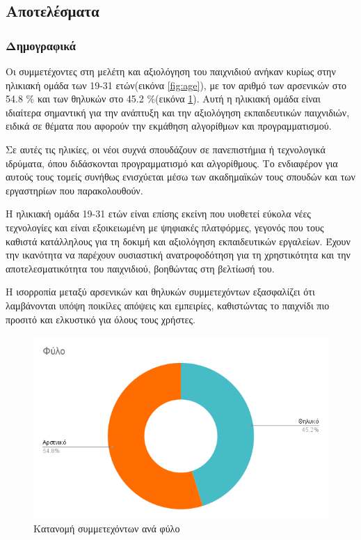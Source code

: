 \subsection{Αποτελέσματα}

\subsubsection{Δημογραφικά}

Οι συμμετέχοντες στη μελέτη και αξιολόγηση του παιχνιδιού ανήκαν κυρίως στην ηλικιακή ομάδα των 19-31 ετών(εικόνα \ref{fig:age}), με τον αριθμό των αρσενικών στο 54.8 \% και των θηλυκών στο 45.2 \%(εικόνα \ref{fig:gender}). Αυτή η ηλικιακή ομάδα είναι ιδιαίτερα σημαντική για την ανάπτυξη και την αξιολόγηση εκπαιδευτικών παιχνιδιών, ειδικά σε θέματα που αφορούν την εκμάθηση αλγορίθμων και προγραμματισμού.

Σε αυτές τις ηλικίες, οι νέοι συχνά σπουδάζουν σε πανεπιστήμια ή τεχνολογικά ιδρύματα, όπου διδάσκονται προγραμματισμό και αλγορίθμους. Το ενδιαφέρον για αυτούς τους τομείς συνήθως ενισχύεται μέσω των ακαδημαϊκών τους σπουδών και των εργαστηρίων που παρακολουθούν.

Η ηλικιακή ομάδα 19-31 ετών είναι επίσης εκείνη που υιοθετεί εύκολα νέες τεχνολογίες και είναι εξοικειωμένη με ψηφιακές πλατφόρμες, γεγονός που τους καθιστά κατάλληλους για τη δοκιμή και αξιολόγηση εκπαιδευτικών εργαλείων. Έχουν την ικανότητα να παρέχουν ουσιαστική ανατροφοδότηση για τη χρηστικότητα και την αποτελεσματικότητα του παιχνιδιού, βοηθώντας στη βελτίωσή του.

Η ισορροπία μεταξύ αρσενικών και θηλυκών συμμετεχόντων εξασφαλίζει ότι λαμβάνονται υπόψη ποικίλες απόψεις και εμπειρίες, καθιστώντας το παιχνίδι πιο προσιτό και ελκυστικό για όλους τους χρήστες.

\begin{figure}[H]
    \centering
    \includegraphics[width=0.7\linewidth]{sections/5/2/images/gender}
    \caption{Κατανομή συμμετεχόντων ανά φύλο}
    \label{fig:gender}
\end{figure}

